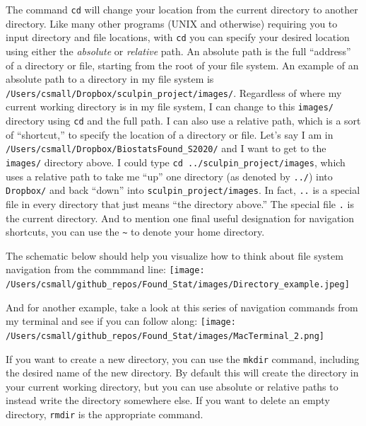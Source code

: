 \documentclass[]{book}
\begin{document}
The command \texttt{cd} will change your location from the current directory to another directory. Like many other programs (UNIX and otherwise) requiring you to input directory and file locations, with \texttt{cd} you can specify your desired location using either the \emph{absolute} or \emph{relative} path. An absolute path is the full ``address'' of a directory or file, starting from the root of your file system. An example of an absolute path to a directory in my file system is \texttt{/Users/csmall/Dropbox/sculpin\_project/images/}. Regardless of where my current working directory is in my file system, I can change to this \texttt{images/} directory using \texttt{cd} and the full path. I can also use a relative path, which is a sort of ``shortcut,'' to specify the location of a directory or file. Let's say I am in \texttt{/Users/csmall/Dropbox/BiostatsFound\_S2020/} and I want to get to the \texttt{images/} directory above. I could type \texttt{cd\ ../sculpin\_project/images}, which uses a relative path to take me ``up'' one directory (as denoted by \texttt{../}) into \texttt{Dropbox/} and back ``down'' into \texttt{sculpin\_project/images}. In fact, \texttt{..} is a special file in every directory that just means ``the directory above.'' The special file \texttt{.} is the current directory. And to mention one final useful designation for navigation shortcuts, you can use the \texttt{\textasciitilde{}} to denote your home directory.

The schematic below should help you visualize how to think about file system navigation from the commmand line:
\texttt{[image: /Users/csmall/github\_repos/Found\_Stat/images/Directory\_example.jpeg]}

And for another example, take a look at this series of navigation commands from my terminal and see if you can follow along:
\texttt{[image: /Users/csmall/github\_repos/Found\_Stat/images/MacTerminal\_2.png]}

If you want to create a new directory, you can use the \texttt{mkdir} command, including the desired name of the new directory. By default this will create the directory in your current working directory, but you can use absolute or relative paths to instead write the directory somewhere else. If you want to delete an empty directory, \texttt{rmdir} is the appropriate command.
\end{document}
